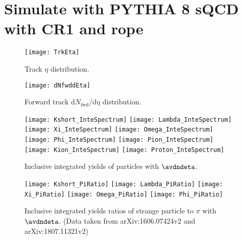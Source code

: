 
\section{Simulate with PYTHIA 8 sQCD with CR1 and rope}%
\label{sec:CRorRope}

\begin{figure}[t]
        \begin{center}
                \texttt{[image: TrkEta]}
        \end{center}
        \caption{Track $\eta$ distribution.}
        \label{fig:TrkEta}
\end{figure}

\begin{figure}[t]
	\begin{center}
		\texttt{[image: dNfwddEta]}
	\end{center}
	\caption{Forward track $\mathrm{d}N_\mathrm{fwd}/\mathrm{d}\eta$ distribution.}
	\label{fig:TrkdNdEta}
\end{figure}

\begin{figure}[ht]
	\begin{center}
		\texttt{[image: Kshort\_InteSpectrum]}
		\texttt{[image: Lambda\_InteSpectrum]}
		\texttt{[image: Xi\_InteSpectrum]}
		\texttt{[image: Omega\_InteSpectrum]}
		\texttt{[image: Phi\_InteSpectrum]}
		\texttt{[image: Pion\_InteSpectrum]}
		\texttt{[image: Kion\_InteSpectrum]}
		\texttt{[image: Proton\_InteSpectrum]}
	\end{center}
	\caption{Inclusive integrated yields of particles with $\avdndeta$.}
	\label{fig:InclIntePar}
\end{figure}

\begin{figure}[ht]
	\begin{center}
		\texttt{[image: Kshort\_PiRatio]}
		\texttt{[image: Lambda\_PiRatio]}
		\texttt{[image: Xi\_PiRatio]}
		\texttt{[image: Omega\_PiRatio]}
		\texttt{[image: Phi\_PiRatio]}
	\end{center}
	\caption{Inclusive integrated yields ratios of strange particle to $\pi$ with $\avdndeta$. (Data taken from arXiv:1606.07424v2 and arXiv:1807.11321v2)}
	\label{fig:InclIntePartoPiRatio}
\end{figure}

